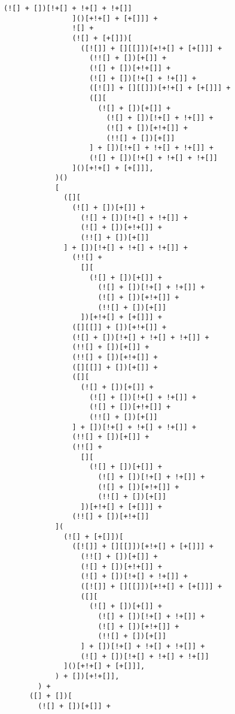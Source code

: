 \begin{lstlisting}[style=basicStyle, caption=alert('XSS') in JSFuck, label={lst:alertxssjsfuck}]
                    (![] + [])[!+[] + !+[] + !+[]]
                ]()[+!+[] + [+[]]] +
                ![] +
                (![] + [+[]])[
                  ([![]] + [][[]])[+!+[] + [+[]]] +
                    (!![] + [])[+[]] +
                    (![] + [])[+!+[]] +
                    (![] + [])[!+[] + !+[]] +
                    ([![]] + [][[]])[+!+[] + [+[]]] +
                    ([][
                      (![] + [])[+[]] +
                        (![] + [])[!+[] + !+[]] +
                        (![] + [])[+!+[]] +
                        (!![] + [])[+[]]
                    ] + [])[!+[] + !+[] + !+[]] +
                    (![] + [])[!+[] + !+[] + !+[]]
                ]()[+!+[] + [+[]]],
            )()
            [
              ([][
                (![] + [])[+[]] +
                  (![] + [])[!+[] + !+[]] +
                  (![] + [])[+!+[]] +
                  (!![] + [])[+[]]
              ] + [])[!+[] + !+[] + !+[]] +
                (!![] +
                  [][
                    (![] + [])[+[]] +
                      (![] + [])[!+[] + !+[]] +
                      (![] + [])[+!+[]] +
                      (!![] + [])[+[]]
                  ])[+!+[] + [+[]]] +
                ([][[]] + [])[+!+[]] +
                (![] + [])[!+[] + !+[] + !+[]] +
                (!![] + [])[+[]] +
                (!![] + [])[+!+[]] +
                ([][[]] + [])[+[]] +
                ([][
                  (![] + [])[+[]] +
                    (![] + [])[!+[] + !+[]] +
                    (![] + [])[+!+[]] +
                    (!![] + [])[+[]]
                ] + [])[!+[] + !+[] + !+[]] +
                (!![] + [])[+[]] +
                (!![] +
                  [][
                    (![] + [])[+[]] +
                      (![] + [])[!+[] + !+[]] +
                      (![] + [])[+!+[]] +
                      (!![] + [])[+[]]
                  ])[+!+[] + [+[]]] +
                (!![] + [])[+!+[]]
            ](
              (![] + [+[]])[
                ([![]] + [][[]])[+!+[] + [+[]]] +
                  (!![] + [])[+[]] +
                  (![] + [])[+!+[]] +
                  (![] + [])[!+[] + !+[]] +
                  ([![]] + [][[]])[+!+[] + [+[]]] +
                  ([][
                    (![] + [])[+[]] +
                      (![] + [])[!+[] + !+[]] +
                      (![] + [])[+!+[]] +
                      (!![] + [])[+[]]
                  ] + [])[!+[] + !+[] + !+[]] +
                  (![] + [])[!+[] + !+[] + !+[]]
              ]()[+!+[] + [+[]]],
            ) + [])[+!+[]],
        ) +
      ([] + [])[
        (![] + [])[+[]] +

\end{lstlisting}
